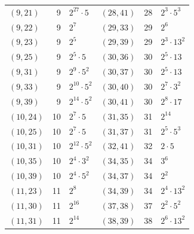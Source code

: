 \documentclass[11pt]{article}
\begin{document}
\begin{longtable}{@{}lrl@{\qquad}lrl@{}}
$(9,21)$ & 9 & $2^{27}\cdot 5$ & $(28,41)$ & 28 & $2^{3}\cdot 5^{3}$\\
$(9,22)$ & 9 & $2^{7}$ & $(29,33)$ & 29 & $2^{6}$\\
$(9,23)$ & 9 & $2^{5}$ & $(29,39)$ & 29 & $2^{3}\cdot 13^{2}$\\
$(9,25)$ & 9 & $2^{5}\cdot 5$ & $(30,36)$ & 30 & $2^{5}\cdot 13$\\
$(9,31)$ & 9 & $2^{9}\cdot 5^{2}$ & $(30,37)$ & 30 & $2^{5}\cdot 13$\\
$(9,33)$ & 9 & $2^{10}\cdot 5^{2}$ & $(30,40)$ & 30 & $2^{7}\cdot 3^{2}$\\
$(9,39)$ & 9 & $2^{14}\cdot 5^{2}$ & $(30,41)$ & 30 & $2^{8}\cdot 17$\\
$(10,24)$ & 10 & $2^{7}\cdot 5$ & $(31,35)$ & 31 & $2^{14}$\\
$(10,25)$ & 10 & $2^{7}\cdot 5$ & $(31,37)$ & 31 & $2^{5}\cdot 5^{3}$\\
$(10,31)$ & 10 & $2^{12}\cdot 5^{2}$ & $(32,41)$ & 32 & $2\cdot 5$\\
$(10,35)$ & 10 & $2^{4}\cdot 3^{2}$ & $(34,35)$ & 34 & $3^{6}$\\
$(10,39)$ & 10 & $2^{4}\cdot 5^{2}$ & $(34,37)$ & 34 & $2^{2}$\\
$(11,23)$ & 11 & $2^{8}$ & $(34,39)$ & 34 & $2^{4}\cdot 13^{2}$\\
$(11,30)$ & 11 & $2^{16}$ & $(37,38)$ & 37 & $2^{2}\cdot 5^{2}$\\
$(11,31)$ & 11 & $2^{14}$ & $(38,39)$ & 38 & $2^{6}\cdot 13^{2}$\\
\end{longtable}
\endgroup
\end{document}

